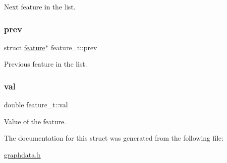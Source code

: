 Next feature in the list. \mbox{\label{structfeature__t_aaaedf64095bcfa79b578a0d90af17afc}} 
\subsubsection{\texorpdfstring{prev}{prev}}
{\footnotesize\ttfamily struct \hyperlink{graphdata_8h_a068417678f021a74e911edd39f8d0bce}{feature}$\ast$ feature\+\_\+t\+::prev}

Previous feature in the list. \mbox{\label{structfeature__t_ad4881468d7929ea65cb2a3b96e8556da}} 
\subsubsection{\texorpdfstring{val}{val}}
{\footnotesize\ttfamily double feature\+\_\+t\+::val}

Value of the feature. 

The documentation for this struct was generated from the following file\+:\begin{DoxyCompactItemize}
\item 
\hyperlink{graphdata_8h}{graphdata.\+h}\end{DoxyCompactItemize}

